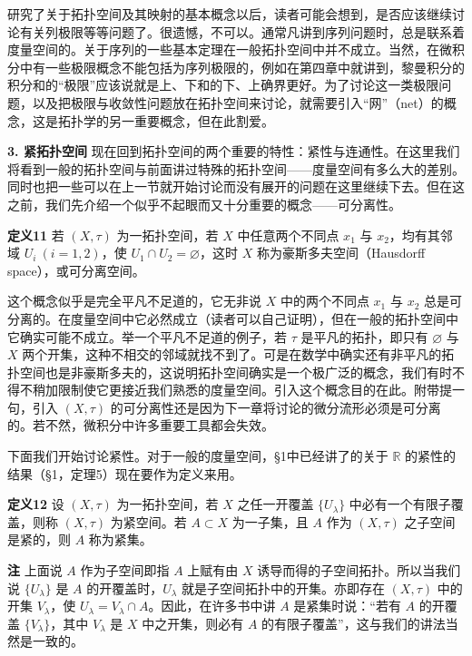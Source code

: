 研究了关于拓扑空间及其映射的基本概念以后，读者可能会想到，是否应该继续讨论有关列极限等等问题了。很遗憾，不可以。通常凡讲到序列问题时，总是联系着度量空间的。关于序列的一些基本定理在一般拓扑空间中并不成立。当然，在微积分中有一些极限概念不能包括为序列极限的，例如在第四章中就讲到，黎曼积分的积分和的“极限”应该说就是上、下和的下、上确界更好。为了讨论这一类极限问题，以及把极限与收敛性问题放在拓扑空间来讨论，就需要引入“网”（net）的概念，这是拓扑学的另一重要概念，但在此割爱。

\noindent\textbf{3. 紧拓扑空间}\quad
现在回到拓扑空间的两个重要的特性：紧性与连通性。在这里我们将看到一般的拓扑空间与前面讲过特殊的拓扑空间——度量空间有多么大的差别。同时也把一些可以在上一节就开始讨论而没有展开的问题在这里继续下去。但在这之前，我们先介绍一个似乎不起眼而又十分重要的概念——可分离性。

\noindent\textbf{定义11}\quad
若 $(X,\tau)$ 为一拓扑空间，若 $X$ 中任意两个不同点 $x_1$ 与 $x_2$，均有其邻域 $U_i\ (i=1,2)$，使 $U_1\cap U_2=\varnothing$，这时 $X$ 称为豪斯多夫空间（Hausdorff space），或可分离空间。

这个概念似乎是完全平凡不足道的，它无非说 $X$ 中的两个不同点 $x_1$ 与 $x_2$ 总是可分离的。在度量空间中它必然成立（读者可以自己证明），但在一般的拓扑空间中它确实可能不成立。举一个平凡不足道的例子，若 $\tau$ 是平凡的拓扑，即只有 $\varnothing$ 与 $X$ 两个开集，这种不相交的邻域就找不到了。可是在数学中确实还有非平凡的拓扑空间也是非豪斯多夫的，这说明拓扑空间确实是一个极广泛的概念，我们有时不得不稍加限制使它更接近我们熟悉的度量空间。引入这个概念目的在此。附带提一句，引入 $(X,\tau)$ 的可分离性还是因为下一章将讨论的微分流形必须是可分离的。若不然，微积分中许多重要工具都会失效。

下面我们开始讨论紧性。对于一般的度量空间，§1中已经讲了的关于 $\mathbb R$ 的紧性的结果（§1，定理5）现在要作为定义来用。

\noindent\textbf{定义12}\quad
设 $(X,\tau)$ 为一拓扑空间，若 $X$ 之任一开覆盖 $\{U_\lambda\}$ 中必有一个有限子覆盖，则称 $(X,\tau)$ 为紧空间。若 $A\subset X$ 为一子集，且 $A$ 作为 $(X,\tau)$ 之子空间是紧的，则 $A$ 称为紧集。

\noindent\textbf{注}\quad
上面说 $A$ 作为子空间即指 $A$ 上赋有由 $X$ 诱导而得的子空间拓扑。所以当我们说 $\{U_\lambda\}$ 是 $A$ 的开覆盖时，$U_\lambda$ 就是子空间拓扑中的开集。亦即存在 $(X,\tau)$ 中的开集 $V_\lambda$，使 $U_\lambda=V_\lambda\cap A$。因此，在许多书中讲 $A$ 是紧集时说：“若有 $A$ 的开覆盖 $\{V_\lambda\}$，其中 $V_\lambda$ 是 $X$ 中之开集，则必有 $A$ 的有限子覆盖”，这与我们的讲法当然是一致的。

